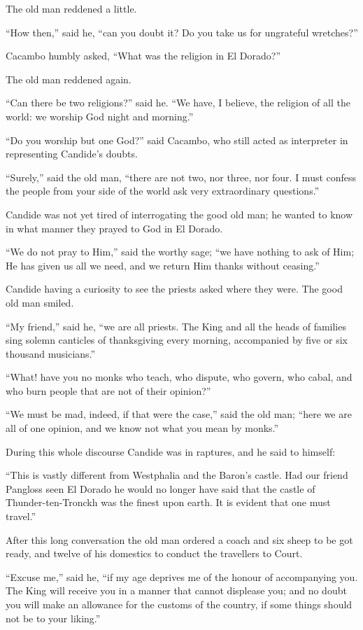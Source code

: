 The old man reddened a little.

``How then,'' said he, ``can you doubt it? Do you take us for ungrateful wretches?''

Cacambo humbly asked, ``What was the religion in El Dorado?''

The old man reddened again.

``Can there be two religions?'' said he. ``We have, I believe, the religion of all the world: we worship God night and morning.''

``Do you worship but one God?'' said Cacambo, who still acted as interpreter in representing Candide's doubts.

``Surely,'' said the old man, ``there are not two, nor three, nor four. I must confess the people from your side of the world ask very extraordinary questions.''

Candide was not yet tired of interrogating the good old man; he wanted to know in what manner they prayed to God in El Dorado.

``We do not pray to Him,'' said the worthy sage; ``we have nothing to ask of Him; He has given us all we need, and we return Him thanks without ceasing.''

Candide having a curiosity to see the priests asked where they were. The good old man smiled.

``My friend,'' said he, ``we are all priests. The King and all the heads of families sing solemn canticles of thanksgiving every morning, accompanied by five or six thousand musicians.''

``What! have you no monks who teach, who dispute, who govern, who cabal, and who burn people that are not of their opinion?''

``We must be mad, indeed, if that were the case,'' said the old man; ``here we are all of one opinion, and we know not what you mean by monks.''

During this whole discourse Candide was in raptures, and he said to himself:

``This is vastly different from Westphalia and the Baron's castle. Had our friend Pangloss seen El Dorado he would no longer have said that the castle of Thunder-ten-Tronckh was the finest upon earth. It is evident that one must travel.''

After this long conversation the old man ordered a coach and six sheep to be got ready, and twelve of his domestics to conduct the travellers to Court.

``Excuse me,'' said he, ``if my age deprives me of the honour of accompanying you. The King will receive you in a manner that cannot displease you; and no doubt you will make an allowance for the customs of the country, if some things should not be to your liking.''


